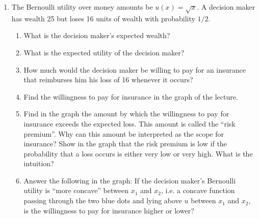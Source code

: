 \documentclass[a4paper,12pt]{article}
\begin{document}
\begin{enumerate}[resume]
\item The Bernoulli utility over money amounts be $u(x)=\sqrt{x}$. A decision maker has wealth 25 but loses 16 units of wealth with probability $1/2$.
  \begin{enumerate}
  \item What is the decision maker's expected wealth?
  \item What is the expected utility of the decision maker?
  \item How much would the decision maker be willing to pay for an insurance that reimburses him his loss of 16 whenever it occurs?
  \item Find the willingness to pay for insurance in the graph of the lecture. 
  \item Find in the graph the amount by which the willingness to pay for insurance exceeds the expected loss. This amount is called the ``risk premium''. Why can this amount be interpreted as the scope for insurance? Show in the graph that the risk premium is low if the probability that a loss occurs is either very low or very high. What is the intuition?
  \item Answer the following in the graph: If the decision maker's Bernoulli utility is ``more concave'' between $x_1$  and $x_2$, i.e. a concave function passing through the two blue dots and lying above $u$ between $x_1$ and $x_2$, is the willingness to pay for insurance higher or lower?
  \end{enumerate}
\end{enumerate}
\end{document}
